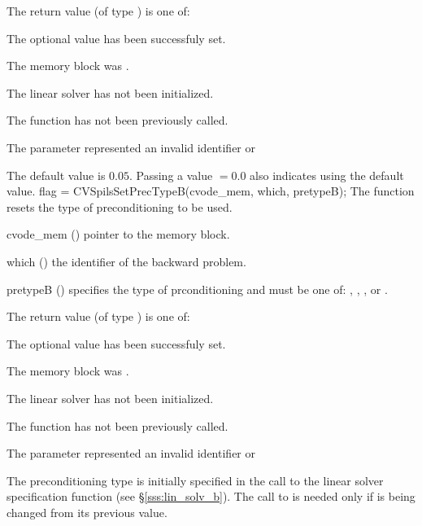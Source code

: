 {
  The return value  (of type ) is one of:
  \begin{args}
  \item[\Id{CVSPILS\_SUCCESS}] 
    The optional value has been successfuly set.
  \item[\Id{CVSPILS\_MEM\_NULL}]
    The  memory block was .
  \item[\Id{CVSPILS\_LMEM\_NULL}]
    The {\cvspils} linear solver has not been initialized.
  \item[\Id{CVSPILS\_NO\_ADJ}]
    The function  has not been previously called.
  \item[\Id{CVSPILS\_ILL\_INPUT}]
    The parameter  represented an invalid identifier or 
  \end{args}
}
{
  The default value is $0.05$.
  Passing a value $ = 0.0$ also indicates using the default value.
}
{
  flag = CVSpilsSetPrecTypeB(cvode\_mem, which, pretypeB);
}
{
  The function  resets the type
  of preconditioning to be used.
}
{
  \begin{args}
  \item[cvode\_mem] ()
    pointer to the {\cvodes} memory block.
  \item[which] ()
    the identifier of the backward problem.
  \item[pretypeB] ()
    specifies the type of prconditioning and must be one of:
    , , , or .
  \end{args}
}
{
  The return value  (of type ) is one of:
  \begin{args}
  \item[\Id{CVSPILS\_SUCCESS}] 
    The optional value has been successfuly set.
  \item[\Id{CVSPILS\_MEM\_NULL}]
    The  memory block was .
  \item[\Id{CVSPILS\_LMEM\_NULL}]
    The {\cvspils} linear solver has not been initialized.
  \item[\Id{CVSPILS\_NO\_ADJ}]
    The function  has not been previously called.
  \item[\Id{CVSPILS\_ILL\_INPUT}]
    The parameter  represented an invalid identifier or 
  \end{args}
}
{
  The preconditioning type is initially specified in the call
  to the linear solver specification function (see \S\ref{sss:lin_solv_b}). 
  The call to  is needed only if  is being changed from its 
  previous value.
}

